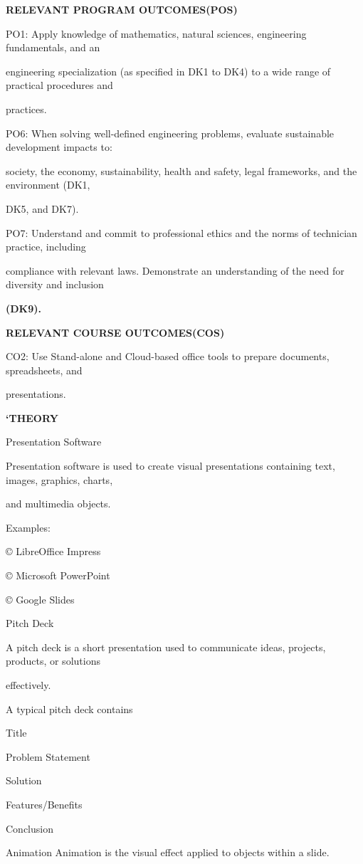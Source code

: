\documentclass[10pt,a4paper]{article}
\begin{document}
\medskip\noindent\textbf{RELEVANT PROGRAM OUTCOMES(POS)}\par
\noindent PO1: Apply knowledge of mathematics, natural sciences, engineering fundamentals, and an\par
\noindent engineering specialization (as specified in DK1 to DK4) to a wide range of practical procedures and\par
\noindent practices.\par
\noindent PO6: When solving well-defined engineering problems, evaluate sustainable development impacts to:\par
\noindent society, the economy, sustainability, health and safety, legal frameworks, and the environment (DK1,\par
\noindent DK5, and DK7).\par
\noindent PO7: Understand and commit to professional ethics and the norms of technician practice, including\par
\noindent compliance with relevant laws. Demonstrate an understanding of the need for diversity and inclusion\par
\medskip\noindent\textbf{(DK9).}\par

\medskip\noindent\textbf{RELEVANT COURSE OUTCOMES(COS)}\par
\noindent CO2: Use Stand-alone and Cloud-based office tools to prepare documents, spreadsheets, and\par
\noindent presentations.\par
\medskip\noindent\textbf{‘THEORY}\par

\noindent Presentation Software\par
\noindent Presentation software is used to create visual presentations containing text, images, graphics, charts,\par
\noindent and multimedia objects.\par

\noindent Examples:\par
\noindent © LibreOffice Impress\par
\noindent © Microsoft PowerPoint\par
\noindent © Google Slides\par

\noindent Pitch Deck\par
\noindent A pitch deck is a short presentation used to communicate ideas, projects, products, or solutions\par
\noindent effectively.\par
\noindent A typical pitch deck contains\par
\noindent Title\par
\noindent Problem Statement\par
\noindent Solution\par
\noindent Features/Benefits\par
\noindent Conclusion\par
\noindent Animation Animation is the visual effect applied to objects within a slide.\par
\end{document}
